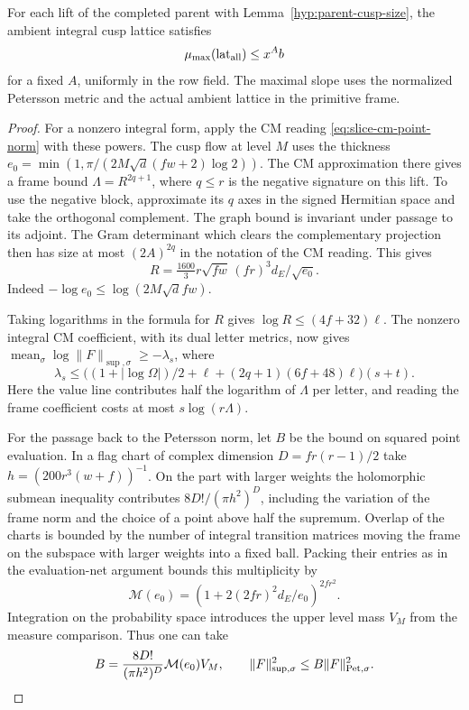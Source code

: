 \begin{proposition}
\label{prop:parent-cusp-maximal-slope}
For each lift of the completed parent with
Lemma~\ref{hyp:parent-cusp-size}, the ambient integral cusp
lattice satisfies
\[
  \mu_{\max}(\mathrm{lat}_{\rm all})\le x^A b
\]
for a fixed \(A\), uniformly in the row field. The maximal slope
uses the normalized Petersson metric and the actual ambient
lattice in the primitive frame.
\end{proposition}

\begin{proof}
For a nonzero integral form, apply the CM reading
\eqref{eq:slice-cm-point-norm} with these powers. The cusp
flow at level \(M\) uses the thickness
\(e_0=\min(1,\pi/(2M\sqrt d(fw+2)\log2))\).
The CM approximation there gives a frame bound
\(\Lambda=R^{2q+1}\), where \(q\le r\) is the negative signature
on this lift. To use the negative block, approximate its \(q\)
axes in the signed Hermitian space and take the orthogonal
complement. The graph bound is invariant under passage to its
adjoint. The Gram determinant which clears the complementary
projection then has size at most \((2A)^{2q}\) in the notation
of the CM reading. This gives
\[
 R=\tfrac{1600}{3}r\sqrt{fw}\,(fr)^3d_E/\sqrt{e_0}.
\]
Indeed \(-\log e_0\le\log(2M\sqrt d f w)\).

Taking logarithms in the formula for \(R\) gives
\(\log R\le(4f+32)\ell\). The nonzero integral CM
coefficient, with its dual letter metrics, now gives
\(\operatorname{mean}_\sigma\log\|F\|_{\sup,\sigma}\ge-\lambda_s\),
where
\[
 \lambda_s\le
 \bigl((1+|\log\Omega|)/2+\ell+
                  (2q+1)(6f+48)\ell\bigr)(s+t).
\]
Here the value line contributes half the logarithm of
\(\Lambda\) per letter, and reading the frame coefficient costs
at most \(s\log(r\Lambda)\). \label{cor:parent-cusp-slope-2}

For the passage back to the Petersson norm, let \(B\) be the
bound on squared point evaluation. In a flag chart of complex
dimension \(D=fr(r-1)/2\) take \(h=(200r^3(w+f))^{-1}\).
On the part with larger weights the
holomorphic submean inequality contributes
\(8D!/(\pi h^2)^D\), including the variation of the frame norm
and the choice of a point above half the supremum. Overlap
of the charts is bounded by the number of integral transition
matrices moving the frame on the subspace with larger weights into a fixed ball. Packing their
entries as in the evaluation-net argument bounds this
multiplicity by
\[
 \mathcal M(e_0)=(1+2(2fr)^2d_E/e_0)^{2fr^2}.
\]
Integration on the
probability space introduces the upper level mass \(V_M\)
from the measure comparison. Thus one can take
\[
 B=\frac{8D!}{(\pi h^2)^D}\mathcal M(e_0)V_M,\qquad
             \|F\|_{\sup,\sigma}^2\le B\|F\|_{\rm Pet,\sigma}^2 .
\]


\end{proof}
